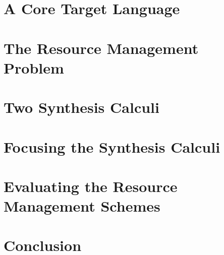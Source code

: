 

\section{A Core Target Language}
\label{sec:linear-base-calculus}


\section{The Resource Management Problem}
\label{sec:resource-management}


\section{Two Synthesis Calculi}
\label{sec:linear-base-synthesis}


\section{Focusing the Synthesis Calculi}
\label{sec:linear-base-focusing}


\section{Evaluating the Resource Management Schemes}
\label{sec:linear-base-evaluation}


\section{Conclusion}
\label{sec:linear-base-conclusion}
